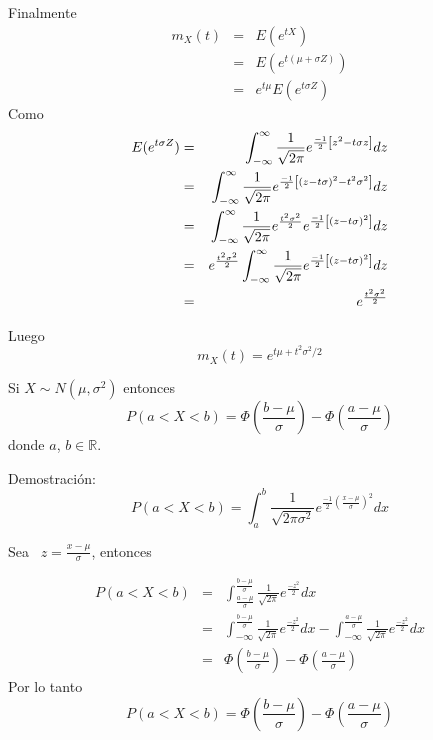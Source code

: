 \begin{i}
Finalmente%
\begin{eqnarray*}
m_{X}(t) &=&E(e^{tX}) \\
&=&E\left( e^{t(\mu +\sigma Z)}\right) \\
&=&e^{t\mu }E(e^{t\sigma Z})
\end{eqnarray*}
Como 
\begin{eqnarray*}
E(e^{t\sigma Z}) &=&\int_{-\infty }^{\infty }\frac{1}{\sqrt{2\pi }}e^{\frac{%
-1}{2}\left[ z^{2}-t\sigma z\right] }dz \\
&=&\int_{-\infty }^{\infty }\frac{1}{\sqrt{2\pi }}e^{\frac{-1}{2}\left[
(z-t\sigma )^{2}-t^{2}\sigma ^{2}\right] }dz \\
&=&\int_{-\infty }^{\infty }\frac{1}{\sqrt{2\pi }}e^{\frac{t^{2}\sigma ^{2}}{%
2}}e^{\frac{-1}{2}\left[ (z-t\sigma )^{2}\right] }dz \\
&=&e^{\frac{t^{2}\sigma ^{2}}{2}}\int_{-\infty }^{\infty }\frac{1}{\sqrt{%
2\pi }}e^{\frac{-1}{2}\left[ (z-t\sigma )^{2}\right] }dz \\
&=&e^{\frac{t^{2}\sigma ^{2}}{2}}
\end{eqnarray*}

Luego 
\begin{equation*}
m_{X}(t)=e^{t\mu +t^{2}\sigma ^{2}/2}
\end{equation*}

\begin{theorem}
Si $X\sim N(\mu ,\sigma ^{2})$ entonces
\begin{equation}
P(a<X<b)=\Phi \left( \frac{b-\mu }{\sigma }\right) -\Phi \left( \frac{a-\mu 
}{\sigma }\right)
\end{equation}
donde $a$, $b\in \mathbb{R}$.
\label{tem4}
\end{theorem}

Demostración:
\begin{equation*}
P(a<X<b)=\int_{a}^{b}\frac{1}{\sqrt{2\pi \sigma ^{2}}}e^{\frac{-1}{2}\left( 
\frac{x-\mu }{\sigma }\right) ^{2}}dx
\end{equation*}

Sea \ $z=\frac{x-\mu }{\sigma }$, entonces

\begin{equation*}
\begin{array}{lll}
P(a<X<b) & = & \int_{\frac{a-\mu }{\sigma }}^{\frac{b-\mu }{\sigma }}\frac{1
}{\sqrt{2\pi }}e^{\frac{-z^{2}}{2}}dx \\ 
& = & \int_{-\infty }^{\frac{b-\mu }{\sigma }}\frac{1}{\sqrt{2\pi }}e^{\frac{
-z^{2}}{2}}dx-\int_{-\infty }^{\frac{a-\mu }{\sigma }}\frac{1}{\sqrt{2\pi }}
e^{\frac{-z^{2}}{2}}dx \\ 
& = & \Phi \left( \frac{b-\mu }{\sigma }\right) -\Phi \left( \frac{a-\mu }{
\sigma }\right)
\end{array}
\end{equation*}
Por lo tanto 
\begin{equation*}
P(a<X<b)=\Phi \left( \frac{b-\mu }{\sigma }\right) -\Phi \left( \frac{a-\mu 
}{\sigma }\right)
\end{equation*}



\end{i}
